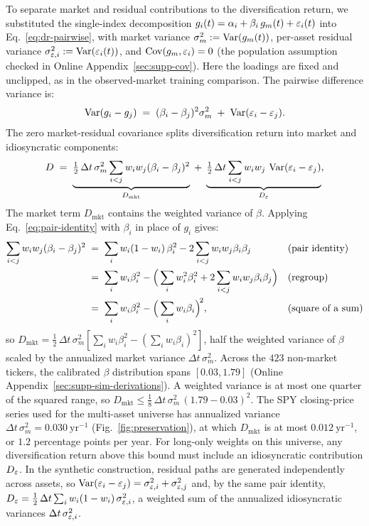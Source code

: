 To separate market and residual contributions to the diversification
return, we substituted the single-index decomposition
$g_i(t) = \alpha_i + \beta_i\, g_m(t) + \varepsilon_i(t)$ into
Eq.~\eqref{eq:dr-pairwise}, with market variance
$\sigma_m^2 := \operatorname{Var}(g_m(t))$, per-asset residual variance
$\sigma_{\varepsilon,i}^2 := \operatorname{Var}(\varepsilon_i(t))$, and $\operatorname{Cov}(g_m, \varepsilon_i) = 0$
(the population assumption checked in Online
Appendix~\ref{sec:supp-cov}). Here the loadings are fixed and
unclipped, as in the observed-market training comparison. The
pairwise difference variance is:
\begin{equation}
  \operatorname{Var}(g_i - g_j) \;=\; (\beta_i - \beta_j)^2 \sigma_m^2
  \;+\; \operatorname{Var}(\varepsilon_i - \varepsilon_j).
\end{equation}
The zero market-residual covariance splits diversification return into market and idiosyncratic components:
\begin{equation}
  D \;=\;
  \underbrace{\tfrac{1}{2}\,\Delta t\,\sigma_m^2 \sum_{i<j} w_i w_j (\beta_i - \beta_j)^2}_{D_{\mathrm{mkt}}}
  \;+\;
  \underbrace{\tfrac{1}{2}\,\Delta t \sum_{i<j} w_i w_j \,\operatorname{Var}(\varepsilon_i - \varepsilon_j)}_{D_\varepsilon},
  \label{eq:dr-sim}
\end{equation}
The market term $D_\mathrm{mkt}$ contains the weighted variance of $\beta$. Applying Eq.~\eqref{eq:pair-identity} with $\beta_i$ in place of $g_i$ gives:
\begin{align}
  \sum_{i<j} w_i w_j (\beta_i - \beta_j)^2
   &\;=\; \sum_i w_i (1 - w_i)\, \beta_i^2
     - 2 \sum_{i<j} w_i w_j \beta_i \beta_j
     && \text{(pair identity)} \notag \\
   &\;=\; \sum_i w_i \beta_i^2
     - \Big(\sum_i w_i^2 \beta_i^2
     + 2 \sum_{i<j} w_i w_j \beta_i \beta_j\Big)
     && \text{(regroup)} \notag \\
   &\;=\; \sum_i w_i \beta_i^2 - \Big(\sum_i w_i \beta_i\Big)^{\!2},
     && \text{(square of a sum)}
\end{align}
so $D_\mathrm{mkt} = \tfrac{1}{2}\,\Delta t\,\sigma_m^2 [\sum_i w_i
\beta_i^2 - (\sum_i w_i \beta_i)^2]$, half the weighted variance of $\beta$
scaled by the annualized market variance $\Delta t\,\sigma_m^2$.
Across the $423$ non-market tickers, the calibrated $\beta$
distribution spans $[0.03, 1.79]$ (Online Appendix~\ref{sec:supp-sim-derivations}). A
weighted variance is at most one quarter of the squared range, so
$D_{\mathrm{mkt}} \le \tfrac{1}{8}\,\Delta t\,\sigma_m^2\,(1.79 -
0.03)^2$. The SPY closing-price series used for the multi-asset
universe has annualized variance $\Delta t\,\sigma_m^2 =
0.030~\mathrm{yr}^{-1}$ (Fig.~\ref{fig:preservation}), at which
$D_{\mathrm{mkt}}$ is at most $0.012~\mathrm{yr}^{-1}$, or $1.2$
percentage points per year. For long-only weights on this universe, any diversification return
above this bound must include an idiosyncratic contribution $D_\varepsilon$. In the synthetic construction, residual paths are
generated independently across assets, so
$\operatorname{Var}(\varepsilon_i - \varepsilon_j) = \sigma_{\varepsilon,i}^2 + \sigma_{\varepsilon,j}^2$ and,
by the same pair identity,
$D_\varepsilon = \tfrac{1}{2}\,\Delta t \sum_i w_i (1 - w_i)\,
\sigma_{\varepsilon,i}^2$, a weighted sum of the annualized idiosyncratic
variances $\Delta t\,\sigma_{\varepsilon,i}^2$.

